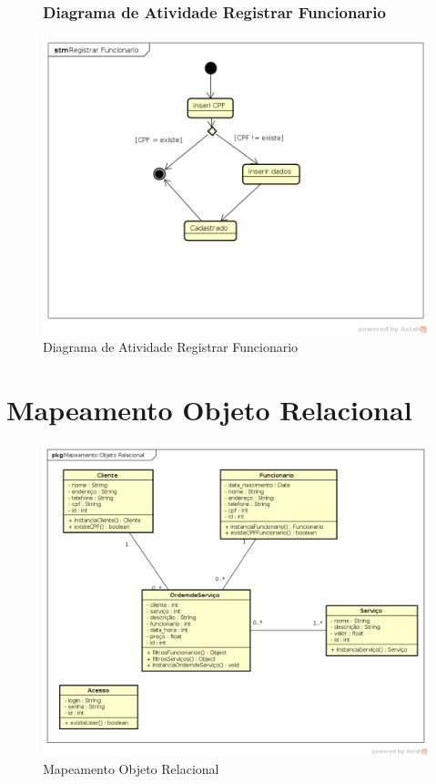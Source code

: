 \documentclass[
	12pt,				%
	openright,
	oneside,			%
	a4paper,			%
	chapter=TITLE,		%
	brazil				%
	]{abntex2}
\begin{document}
\begin{figure}[h!]
\subsection{Diagrama de Atividade Registrar Funcionario}
	\caption{Diagrama de Atividade Registrar Funcionario}
	\begin{center}
	    \includegraphics[scale=0.6]{Arquivos/DTE/Registrar_Funcionario}  
	\end{center}
\end{figure}



\chapter{Mapeamento Objeto Relacional}

\begin{figure}[htb]
	\caption{Mapeamento Objeto Relacional}
	\begin{flushleft}
	    \includegraphics[scale=0.5]{Arquivos/DTE/Mapeamento_Objeto_Relacional}  %
	\end{flushleft}
	\label{fig:caso_de_uso}
\end{figure}
\end{document}
